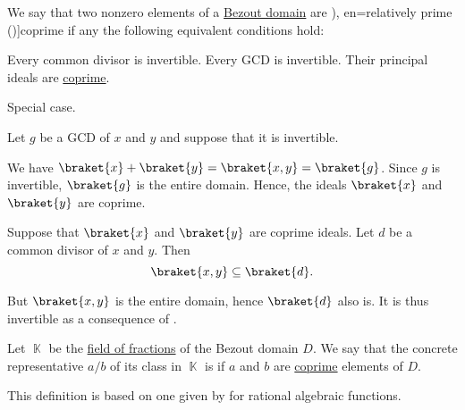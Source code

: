 \begin{definition}\label{def:coprime_elements}\mimprovised
  We say that two nonzero elements of a \hyperref[def:bezout_domain]{Bezout domain} are \term[ru=взаимно простые (идеалы) (\cite[120]{Винберг2014Алгебра}), en=relatively prime (\cite[113]{Lang2002Algebra})]{coprime} if any the following equivalent conditions hold:
  \begin{thmenum}
     Every common divisor is invertible.
     Every GCD is invertible.
     Their principal ideals are \hyperref[def:semiring_ideal/coprime]{coprime}.
  \end{thmenum}
\end{definition}
\begin{defproof}
   Special case.

   Let \( g \) be a GCD of \( x \) and \( y \) and suppose that it is invertible.

  We have \( \braket{ x } + \braket{ y } = \braket{ x, y } = \braket{ g } \). Since \( g \) is invertible, \( \braket{ g } \) is the entire domain. Hence, the ideals \( \braket{ x } \) and \( \braket{ y } \) are coprime.

   Suppose that \( \braket{ x } \) and \( \braket{ y } \) are coprime ideals. Let \( d \) be a common divisor of \( x \) and \( y \). Then
  \begin{equation*}
    \braket{ x, y } \subseteq \braket{ d }.
  \end{equation*}

  But \( \braket{ x, y } \) is the entire domain, hence \( \braket{ d } \) also is. It is thus invertible as a consequence of .
\end{defproof}

\begin{definition}\label{def:lowest_terms}\mimprovised
  Let \( \BbbK \) be the \hyperref[thm:field_of_fractions]{field of fractions} of the Bezout domain \( D \). We say that the concrete representative \( a / b \) of its class in \( \BbbK \) is  if \( a \) and \( b \) are \hyperref[def:coprime_elements]{coprime} elements of \( D \).
\end{definition}
\begin{comments}
  \item This definition is based on one given by  for rational algebraic functions.
\end{comments}

